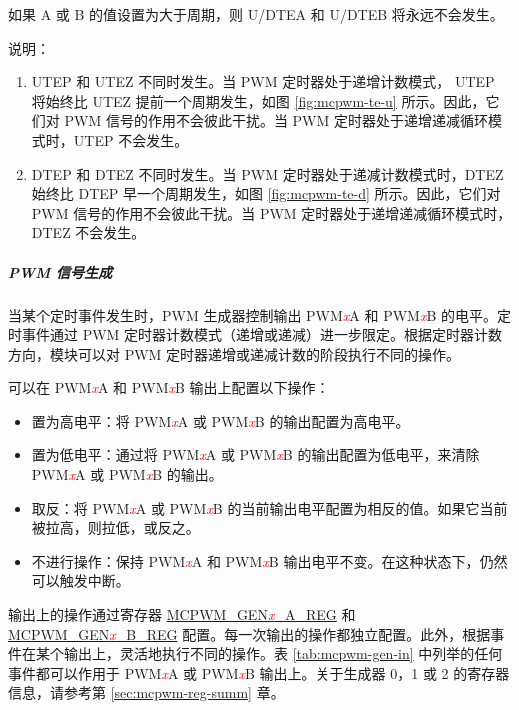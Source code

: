 \documentclass[main\_\_CN.tex]{subfiles}
\begin{document}
如果 A 或 B 的值设置为大于周期，则 U/DTEA 和 U/DTEB 将永远不会发生。




说明：
\begin{enumerate}
    \item UTEP 和 UTEZ 不同时发生。当 PWM 定时器处于递增计数模式， UTEP 将始终比 UTEZ 提前一个周期发生，如图 \ref{fig:mcpwm-te-u} 所示。因此，它们对 PWM 信号的作用不会彼此干扰。当 PWM 定时器处于递增递减循环模式时，UTEP 不会发生。
    \item DTEP 和 DTEZ 不同时发生。当 PWM 定时器处于递减计数模式时，DTEZ 始终比 DTEP 早一个周期发生，如图 \ref{fig:mcpwm-te-d} 所示。因此，它们对 PWM 信号的作用不会彼此干扰。当 PWM 定时器处于递增递减循环模式时，DTEZ 不会发生。
\end{enumerate}

\subparagraph{PWM 信号生成}
当某个定时事件发生时，PWM 生成器控制输出 PWM\textcolor{red}{\it{x}}A 和 PWM\textcolor{red}{\it{x}}B 的电平。定时事件通过 PWM 定时器计数模式（递增或递减）进一步限定。根据定时器计数方向，模块可以对 PWM 定时器递增或递减计数的阶段执行不同的操作。

可以在 PWM\textcolor{red}{\it{x}}A 和 PWM\textcolor{red}{\it{x}}B 输出上配置以下操作：

\begin{itemize}
    \item 置为高电平：将 PWM\textcolor{red}{\it{x}}A 或 PWM\textcolor{red}{\it{x}}B 的输出配置为高电平。
    \item 置为低电平：通过将 PWM\textcolor{red}{\it{x}}A 或 PWM\textcolor{red}{\it{x}}B 的输出配置为低电平，来清除 PWM\textcolor{red}{\it{x}}A 或 PWM\textcolor{red}{\it{x}}B 的输出。
    \item 取反：将 PWM\textcolor{red}{\it{x}}A 或 PWM\textcolor{red}{\it{x}}B 的当前输出电平配置为相反的值。如果它当前被拉高，则拉低，或反之。
    \item 不进行操作：保持 PWM\textcolor{red}{\it{x}}A 和 PWM\textcolor{red}{\it{x}}B 输出电平不变。在这种状态下，仍然可以触发中断。
\end{itemize}

输出上的操作通过寄存器 \hyperref[regdesc:MCPWMGEN0AREG]{MCPWM\_GEN\textcolor{red}{\it{x}}\_A\_REG} 和 \hyperref[regdesc:MCPWMGEN0BREG]{MCPWM\_GEN\textcolor{red}{\it{x}}\_B\_REG} 配置。每一次输出的操作都独立配置。此外，根据事件在某个输出上，灵活地执行不同的操作。表 \ref{tab:mcpwm-gen-in} 中列举的任何事件都可以作用于 PWM\textcolor{red}{\it{x}}A 或 PWM\textcolor{red}{\it{x}}B 输出上。关于生成器 0，1 或 2 的寄存器信息，请参考第 \ref{sec:mcpwm-reg-summ} 章。
\end{document}
